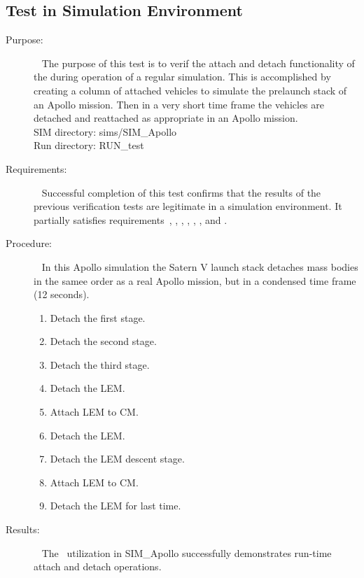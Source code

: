 \subsection{Test in Simulation Environment}
\label{test:mass_12}
\begin{description}
\item[Purpose:] \ \newline
The purpose of this test is to verif the attach and detach functionality of the
\ModelDesc during operation of a regular simulation.  This
is accomplished by creating a column of attached vehicles to simulate the
prelaunch stack of
an Apollo mission.  Then in a very short time frame the vehicles are detached
and reattached
as appropriate in an Apollo mission.\\
SIM directory: sims/SIM\_Apollo\\
Run directory: RUN\_test
\item[Requirements:] \ \newline
Successful completion of this test confirms that the results of the previous
verification tests are legitimate in a simulation environment.  It partially satisfies requirements~, ,
, ,
, , and .
\item[Procedure:]\ \newline
In this Apollo simulation the Satern V launch stack detaches mass bodies in
the samee order as a real Apollo mission, but
in a condensed time frame (12 seconds).
\begin{enumerate}
\item{Detach the first stage.}
\item{Detach the second stage.}
\item{Detach the third stage.}
\item{Detach the LEM.}
\item{Attach LEM to CM.}
\item{Detach the LEM.}
\item{Detach the LEM descent stage.}
\item{Attach LEM to CM.}
\item{Detach the LEM for last time.}
\end{enumerate}
\item[Results:]\ \newline
The \ModelDesc\ utilization in SIM\_Apollo successfully demonstrates run-time
attach and detach operations.
\end{description}

%